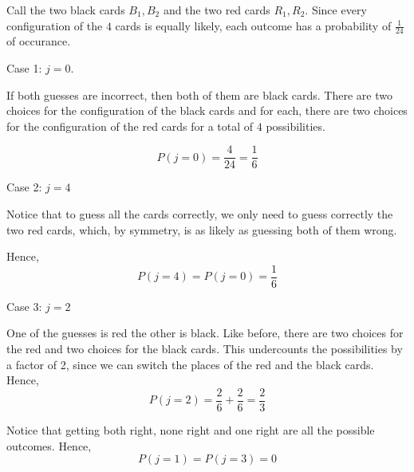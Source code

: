 Call the two black cards $B_{1}, B_{2}$ and the two red cards $R_{1}, R_{2}$.
Since every configuration of the $4$ cards is equally likely, each outcome has 
a probability of $\frac{1}{24}$ of occurance.

Case 1: $j = 0$.

If both guesses are incorrect, then both of them are black cards. There are 
two choices for the configuration of the black cards and for each, there are 
two choices for the configuration of the red cards for a total of $4$ possibilities.

$$P(j=0) = \frac{4}{24} = \frac{1}{6}$$

Case 2: $j = 4$

Notice that to guess all the cards correctly, we only need to guess correctly 
the two red cards, which, by symmetry, is as likely as guessing both of them wrong.

Hence, $$P(j=4) = P(j=0) = \frac{1}{6}$$

Case 3: $j=2$

One of the guesses is red the other is black. Like before, there are two 
choices for the red and two choices for the black cards. This undercounts the 
possibilities by a factor of 2, since we can switch the places of the red and 
the black cards. Hence, $$P(j=2) = \frac{2}{6} + \frac{2}{6} = \frac{2}{3}$$

Notice that getting both right, none right and one right are all the possible 
outcomes. Hence, $$P(j=1) = P(j=3) = 0$$
